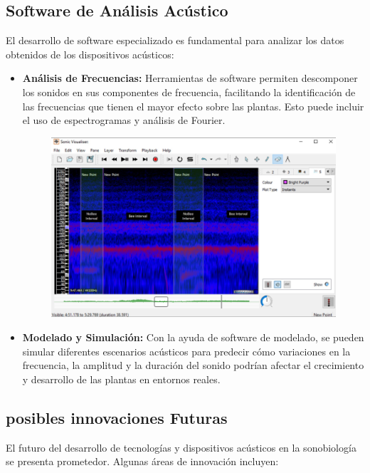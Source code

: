 \documentclass[twocolumn]{article}
\begin{document}
\subsection{Software de Análisis Acústico}

El desarrollo de software especializado es fundamental para analizar los datos obtenidos de los dispositivos acústicos:

\begin{itemize}
    \item \textbf{Análisis de Frecuencias:} Herramientas de software permiten descomponer los sonidos en sus componentes de frecuencia, facilitando la identificación de las frecuencias que tienen el mayor efecto sobre las plantas. Esto puede incluir el uso de espectrogramas y análisis de Fourier.
    \begin{figure}[!h]
        \centering
        \includegraphics[width=\linewidth]{imagenes/Captura desde 2024-09-25 22-52-15.png}       
    \end{figure}
    \item \textbf{Modelado y Simulación:} Con la ayuda de software de modelado, se pueden simular diferentes escenarios acústicos para predecir cómo variaciones en la frecuencia, la amplitud y la duración del sonido podrían afectar el crecimiento y desarrollo de las plantas en entornos reales.
\end{itemize}

\subsection{posibles innovaciones Futuras}

El futuro del desarrollo de tecnologías y dispositivos acústicos en la sonobiología se presenta prometedor. Algunas áreas de innovación incluyen:
\end{document}
